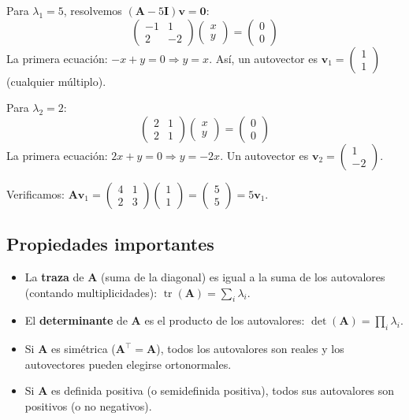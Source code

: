 \documentclass[12pt,a4paper,openany,oneside]{book}
\begin{document}
Para $\lambda_1 = 5$, resolvemos $(\mathbf{A} - 5\mathbf{I})\mathbf{v} = \mathbf{0}$:
\[
\begin{pmatrix} -1 & 1 \\ 2 & -2 \end{pmatrix} \begin{pmatrix} x \\ y \end{pmatrix} = \begin{pmatrix} 0 \\ 0 \end{pmatrix}
\]
La primera ecuación: $-x + y = 0 \Rightarrow y = x$. Así, un autovector es $\mathbf{v}_1 = \begin{pmatrix} 1 \\ 1 \end{pmatrix}$ (cualquier múltiplo).

Para $\lambda_2 = 2$:
\[
\begin{pmatrix} 2 & 1 \\ 2 & 1 \end{pmatrix} \begin{pmatrix} x \\ y \end{pmatrix} = \begin{pmatrix} 0 \\ 0 \end{pmatrix}
\]
La primera ecuación: $2x + y = 0 \Rightarrow y = -2x$. Un autovector es $\mathbf{v}_2 = \begin{pmatrix} 1 \\ -2 \end{pmatrix}$.

Verificamos: $\mathbf{A}\mathbf{v}_1 = \begin{pmatrix} 4 & 1 \\ 2 & 3 \end{pmatrix} \begin{pmatrix} 1 \\ 1 \end{pmatrix} = \begin{pmatrix} 5 \\ 5 \end{pmatrix} = 5 \mathbf{v}_1$.

\subsection{Propiedades importantes}
\begin{itemize}
    \item La \textbf{traza} de $\mathbf{A}$ (suma de la diagonal) es igual a la suma de los autovalores (contando multiplicidades): $\operatorname{tr}(\mathbf{A}) = \sum_i \lambda_i$.
    \item El \textbf{determinante} de $\mathbf{A}$ es el producto de los autovalores: $\det(\mathbf{A}) = \prod_i \lambda_i$.
    \item Si $\mathbf{A}$ es simétrica ($\mathbf{A}^\top = \mathbf{A}$), todos los autovalores son reales y los autovectores pueden elegirse ortonormales.
    \item Si $\mathbf{A}$ es definida positiva (o semidefinida positiva), todos sus autovalores son positivos (o no negativos).
\end{itemize}
\end{document}
